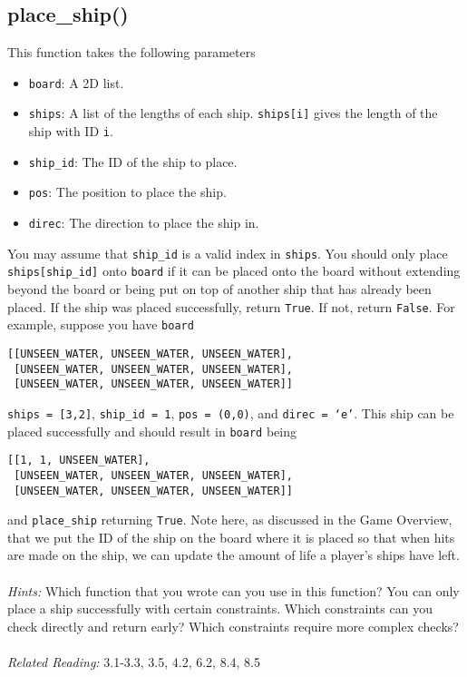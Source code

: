 \documentclass{article}
\begin{document}
\subsection{place\_ship()}
This function takes the following parameters
\begin{itemize}
    \item \texttt{board}: A 2D list.
    \item \texttt{ships}: A list of the lengths of each ship. \texttt{ships[i]} gives the length of the ship with ID \texttt{i}.
    \item \texttt{ship\_id}: The ID of the ship to place.
    \item \texttt{pos}: The position to place the ship.
    \item \texttt{direc}: The direction to place the ship in.
\end{itemize}
You may assume that \texttt{ship\_id} is a valid index in \texttt{ships}. You should only place \texttt{ships[ship\_id]} onto \texttt{board} if it can be placed onto the board without extending beyond the board or being put on top of another ship that has already been placed. If the ship was placed successfully, return \texttt{True}. If not, return \texttt{False}. For example, suppose you have \texttt{board}
\begin{verbatim}
[[UNSEEN_WATER, UNSEEN_WATER, UNSEEN_WATER], 
 [UNSEEN_WATER, UNSEEN_WATER, UNSEEN_WATER], 
 [UNSEEN_WATER, UNSEEN_WATER, UNSEEN_WATER]]
\end{verbatim}
\texttt{ships = [3,2]}, \texttt{ship\_id = 1}, \texttt{pos = (0,0)}, and \texttt{direc = `e'}. This ship can be placed successfully and should result in \texttt{board} being
\begin{verbatim}
[[1, 1, UNSEEN_WATER], 
 [UNSEEN_WATER, UNSEEN_WATER, UNSEEN_WATER], 
 [UNSEEN_WATER, UNSEEN_WATER, UNSEEN_WATER]]
\end{verbatim}
and \texttt{place\_ship} returning \texttt{True}. Note here, as discussed in the Game Overview, that we put the ID of the ship on the board where it is placed so that when hits are made on the ship, we can update the amount of life a player's ships have left.\\\\
\textit{Hints:} Which function that you wrote can you use in this function? You can only place a ship successfully with certain constraints. Which constraints can you check directly and return early? Which constraints require more complex checks?\\\\
\textit{Related Reading:} 3.1-3.3, 3.5, 4.2, 6.2, 8.4, 8.5
\end{document}
